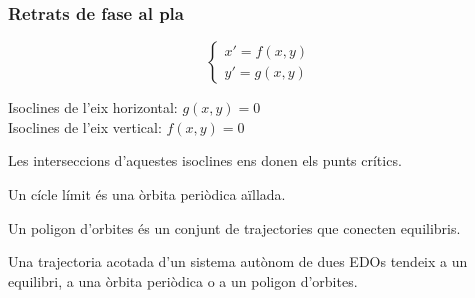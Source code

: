 \documentclass[../main.tex]{subfiles}
\begin{document}
\subsubsection{Retrats de fase al pla}
\begin{displaymath}
	\begin{cases}
		x' = f(x, y)\\
		y' = g(x, y)
	\end{cases}
\end{displaymath}
\begin{definicio}
	Isoclines de l'eix horizontal: $g(x, y) = 0$\\
	Isoclines de l'eix vertical: $f(x, y) = 0$
\end{definicio}
Les interseccions d'aquestes isoclines ens donen els punts crítics.\\
\begin{definicio}
	Un cícle límit és una òrbita periòdica aïllada.
\end{definicio}
\begin{definicio}
	Un poligon d'orbites és un conjunt de trajectories que conecten equilibris.
\end{definicio}
\begin{teorema}
	Una trajectoria acotada d'un sistema autònom de dues EDOs tendeix a un equilibri, a una òrbita periòdica o a un poligon d'orbites.
\end{teorema}
\end{document}
